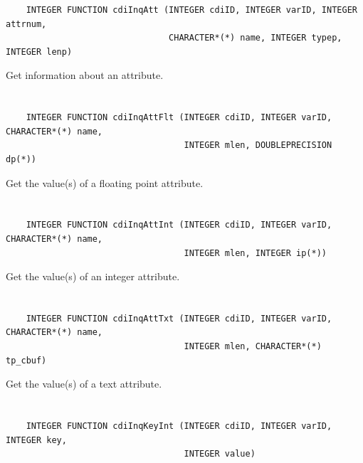 \begin{verbatim}
    INTEGER FUNCTION cdiInqAtt (INTEGER cdiID, INTEGER varID, INTEGER attrnum,
                                CHARACTER*(*) name, INTEGER typep, INTEGER lenp)
\end{verbatim}

Get information about an attribute.


\section*{\tt {}}

\begin{verbatim}
    INTEGER FUNCTION cdiInqAttFlt (INTEGER cdiID, INTEGER varID, CHARACTER*(*) name,
                                   INTEGER mlen, DOUBLEPRECISION dp(*))
\end{verbatim}

Get the value(s) of a floating point attribute.


\section*{\tt {}}

\begin{verbatim}
    INTEGER FUNCTION cdiInqAttInt (INTEGER cdiID, INTEGER varID, CHARACTER*(*) name,
                                   INTEGER mlen, INTEGER ip(*))
\end{verbatim}

Get the value(s) of an integer attribute.


\section*{\tt {}}

\begin{verbatim}
    INTEGER FUNCTION cdiInqAttTxt (INTEGER cdiID, INTEGER varID, CHARACTER*(*) name,
                                   INTEGER mlen, CHARACTER*(*) tp_cbuf)
\end{verbatim}

Get the value(s) of a text attribute.


\section*{\tt {}}

\begin{verbatim}
    INTEGER FUNCTION cdiInqKeyInt (INTEGER cdiID, INTEGER varID, INTEGER key,
                                   INTEGER value)
\end{verbatim}

